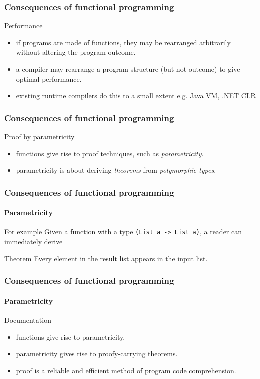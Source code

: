 \begin{frame}
\frametitle{Consequences of functional programming}
\begin{block}{Performance}
\begin{itemize}
\item<1-> if programs are made of functions, they may be rearranged arbitrarily without altering the program outcome.
\item<2-> a compiler may rearrange a program structure (but not outcome) to give optimal performance.
\item<3-> existing runtime compilers do this to a small extent e.g. Java VM, .NET CLR
\end{itemize}
\end{block}
\end{frame}

\begin{frame}
\frametitle{Consequences of functional programming}
\begin{block}{Proof by parametricity \cite{wadler1989theorems}}
\begin{itemize}
\item<1-> functions give rise to proof techniques, such as \emph{parametricity}.
\item<2-> parametricity is about deriving \emph{theorems} from \emph{polymorphic types}.
\end{itemize}
\end{block}
\end{frame}

\begin{frame}
\frametitle{Consequences of functional programming}
\framesubtitle{Parametricity}
\begin{block}{For example}
Given a function with a type \lstinline{(List a -> List a)}, a reader can immediately derive
\end{block}
\begin{block}{Theorem}
Every element in the result list appears in the input list.
\end{block}

\end{frame}

\begin{frame}
\frametitle{Consequences of functional programming}
\framesubtitle{Parametricity}
\begin{block}{Documentation}
\begin{itemize}
\item <1-> functions give rise to parametricity.
\item <2-> parametricity gives rise to proofy-carrying theorems.
\item <3-> proof is a reliable and efficient method of program code comprehension.
\end{itemize}
\end{block}
\end{frame}
